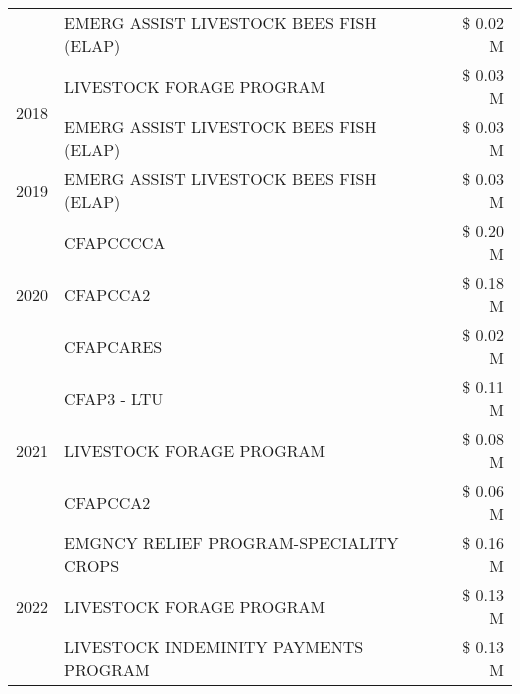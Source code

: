 \begin{tabular}{llr}
 & EMERG ASSIST LIVESTOCK BEES FISH (ELAP) & \$ 0.02 M \\
\cline{1-3}
\multirow[t]{2}{*}{2018} & LIVESTOCK FORAGE PROGRAM & \$ 0.03 M \\
 & EMERG ASSIST LIVESTOCK BEES FISH (ELAP) & \$ 0.03 M \\
\cline{1-3}
2019 & EMERG ASSIST LIVESTOCK BEES FISH (ELAP) & \$ 0.03 M \\
\cline{1-3}
\multirow[t]{3}{*}{2020} & CFAPCCCCA & \$ 0.20 M \\
 & CFAPCCA2 & \$ 0.18 M \\
 & CFAPCARES & \$ 0.02 M \\
\cline{1-3}
\multirow[t]{3}{*}{2021} & CFAP3 - LTU & \$ 0.11 M \\
 & LIVESTOCK FORAGE PROGRAM & \$ 0.08 M \\
 & CFAPCCA2 & \$ 0.06 M \\
\cline{1-3}
\multirow[t]{3}{*}{2022} & EMGNCY RELIEF PROGRAM-SPECIALITY CROPS & \$ 0.16 M \\
 & LIVESTOCK FORAGE PROGRAM & \$ 0.13 M \\
 & LIVESTOCK INDEMINITY PAYMENTS PROGRAM & \$ 0.13 M \\
\cline{1-3}
\bottomrule
\end{tabular}
